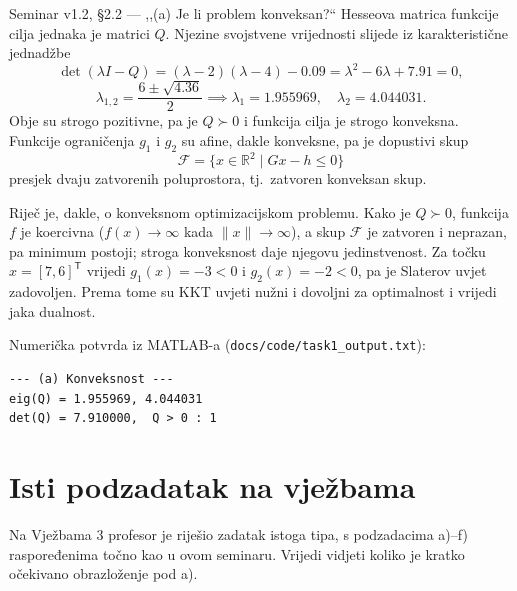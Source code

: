 \begin{seminar}{Seminar v1.2, §2.2 --- ,,(a) Je li problem konveksan?``}
Hesseova matrica funkcije cilja jednaka je matrici $Q$. Njezine svojstvene
vrijednosti slijede iz karakteristične jednadžbe
\[
\det(\lambda I - Q) = (\lambda - 2)(\lambda - 4) - 0.09 = \lambda^2 - 6\lambda + 7.91 = 0,
\]
\[
\lambda_{1,2} = \frac{6 \pm \sqrt{4.36}}{2} \implies \lambda_1 = 1.955969, \quad \lambda_2 = 4.044031.
\]
Obje su strogo pozitivne, pa je $Q \succ 0$ i funkcija cilja je strogo konveksna.
Funkcije ograničenja $g_1$ i $g_2$ su afine, dakle konveksne, pa je dopustivi skup
\[
\mathcal{F} = \{x \in \mathbb{R}^2 \mid Gx - h \leq 0\}
\]
presjek dvaju zatvorenih poluprostora, tj.\ zatvoren konveksan skup.

Riječ je, dakle, o konveksnom optimizacijskom problemu. Kako je $Q \succ 0$,
funkcija $f$ je koercivna ($f(x) \to \infty$ kada $\|x\| \to \infty$), a skup
$\mathcal{F}$ je zatvoren i neprazan, pa minimum postoji; stroga konveksnost daje
njegovu jedinstvenost. Za točku $x = [7, 6]^{\mathsf{T}}$ vrijedi $g_1(x) = -3 < 0$
i $g_2(x) = -2 < 0$, pa je Slaterov uvjet zadovoljen. Prema tome su KKT uvjeti
nužni i dovoljni za optimalnost i vrijedi jaka dualnost.
\end{seminar}

Numerička potvrda iz MATLAB-a (\texttt{docs/code/\allowbreak task1\_output.txt}):

\begin{lstlisting}[style=outputstyle]
--- (a) Konveksnost ---
eig(Q) = 1.955969, 4.044031
det(Q) = 7.910000,  Q > 0 : 1
\end{lstlisting}

\section{Isti podzadatak na vježbama}
\label{sec:z1a-vjezbe}

Na Vježbama 3 profesor je riješio zadatak istoga tipa, s podzadacima a)--f)
raspoređenima točno kao u ovom seminaru. Vrijedi vidjeti koliko je kratko
očekivano obrazloženje pod a).

